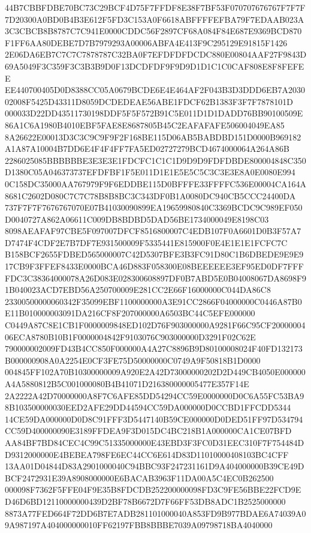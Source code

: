 \documentclass[UTF8,fontset=fandol,zihao=-4,a4paper]{ctexart}
\begin{document}
{{44B7CBBFDBE70BC73C29BCF4D75F7FFDF8E38F7BF53F070707676767F7F7F7D20300A0BD0B4B3E612F5FD3C153A0F6618ABFFFFEFBA79F7EDAAB023A
3C3CBCB8B8787C7C941E0000CDDC56F2897CF68A084F84E687E9369BCD870F1FF6AA80DEBE7D7B7979293A00006ABFA4E413F9C295129E91815F1426
2E06DA6EB7C7C7C7878787C32BA0F7EFDFDFDCDC880E00804AAF27F9843D69A5049F3C359F3C3B3B9D0F13DCDFDF9F9D9D1D1C1C0CAF808E8F8FEFEE
EE440700405D0D8388CC05A0679BCDE6E4E464AF2F043B3D3DDD6EB7A203002008F5425D43311D8059DCDEDEAE56ABE1FDCF62B1383F3F7F7878101D
000033D22DD43511730198DDF5F5F572B91C5E011D1D1DADD76BB90100509E86A1C6A1980B4010EBF5FAE8E8687805B45C2EAFAFAFE506004049EA85
8A26622E00013D3C3C9C9F9F2F168BE115D06AB5BABDBD151D0000B969182A1A87A10004B7DD6E4F4F4FF7FA5ED02727279BCD4674000064A264A86B
2286025085BBBBBBE3E3E3E1FDCFC1C1C1D9D9D9FDFDBDE800004848C350D1380C05A046373737EFDFBF1F5E011D1E1E5E5C5C3C3E3E8A0E0080E994
0C158DC35000AA767979F9F6EDDBE115D0BFFFE33FFFFC536E00004CA164A8681C2602D080C7C7C78B8B8BC3C343DF0B1A0080DC940CB5CCC24400DA
737F7F7F7676767070E07B41030090899EA19659980840C3369BCDC9C989EF050D0040727A862A06611C009DB8BDBD5DAD56BE1734000049E8198C03
8098AEAFAF97CBE5F097007DFCF8516800007C4EDB107F0A6601D0B3F57A7D7474F4CDF2E7B7DF7E931500009F5335441E815900F0E4E1E1E1FCFC7C
B158BCF2655FDBED565000007C42D5307BFE3B3FC91D80C1B6DBEDE9E9E917CB9F3FFEF8433E0000BCA46D883F058300E08BEEEEEE3EF95ED0DF7FFF
FDC3C38364000078A26D083E028300608897DF0B7ABD5E0B04008067DA8698F91B040023ACD7EBD56A250700009E281CC2E66F16000000C044DA86C8
23300500000060342F35099EBF1100000000A3E91CC2866F04000000C0446A87B0E11B010000003091DA216CF8F207000000A6503BC44C5EFE000000
C0449A87C8E1CB1F0000009848ED102D76F903000000A9281F66C95CF2000000406ECA8780B10B1F0000004842F9103076C903000000D3291F02C62E
790000002009FD43B4CC850F000000A4A27C8896B9D80100008024F40FD132173B000000908A0A2254E0CF3FE75D50000000C0749A9F50818B1D0000
004845FF102A70B10300000009A920E2A42D73000000202D2D449CB4050E000000A4A5880812B5C001000080B4B41071D216380000005477E357F14E
2A2222A42D70000000A8F7C6AFE85DD54294CC59E0000000D0C6A55FC53BA98B103500000030EED2AFE29DD44594CC59DA000000D0CCBD1FFCDD5344
14CE59DA000000D0D8C91FFF3D5447140B59CE000000D0DED51FF97D534794CC59D400000090E3189FFDEA9F3D015DC4BC218B1A000000CA1CE07BFD
AA84BF7BD84CEC4C99C51335000000E43EBD3F3FC0D31EEC310F7F754484DD9312000000E4BEBEA798FE6EC44CC6E614D83D11010000408103BC4CFF
13AA01D04844D83A2901000040C94BBC93F247231161D9A404000000B39CE49DBCF2472931E39A8908000000E6BACAB3963F11DA00A5C4EC0B262500
000098F7362F5FFE04F9E35B8FDCDB252200000098FD3C9FE56BBE22FCD9ED46D6BD12110000000439D2BF78B6672D7F66FF53DB8ADC1B2525000000
8873A77FED664F72DD6B7E7ADB281101000040A853FD9B977BDAE6A74039A09A987197A404000000010FF62197FBB8BBBE7039A09798718BA4040000
}}
\end{document}
